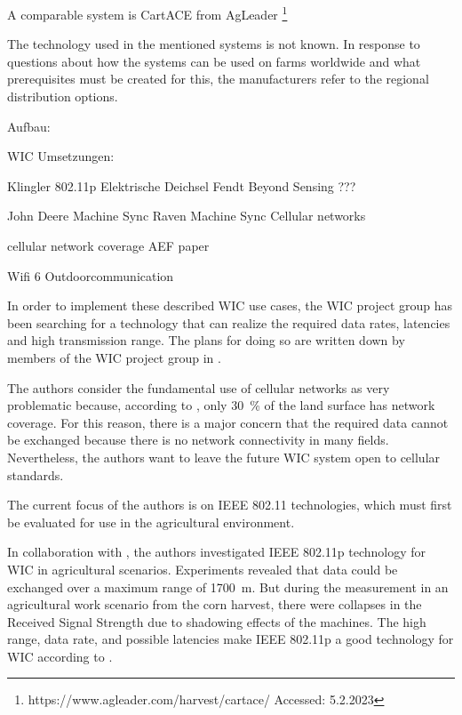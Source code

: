 \documentclass[]{nsm-thesis}
\begin{document}
A comparable system is CartACE from AgLeader \footnote{https://www.agleader.com/harvest/cartace/ Accessed: 5.2.2023}

The technology used in the mentioned systems is not known. In response to questions about how the systems can be used on farms worldwide and what prerequisites must be created for this, the manufacturers refer to the regional distribution options. 



Aufbau:

WIC Umsetzungen: 

Klingler 802.11p
Elektrische Deichsel Fendt
Beyond Sensing ???

John Deere Machine Sync
Raven Machine Sync
Cellular networks

cellular network coverage AEF paper 

Wifi 6 Outdoorcommunication



In order to implement these described \ac{WIC} use cases, the \ac{WIC} project group has been searching for a technology that can realize the required data rates, latencies and high transmission range. The plans for doing so are written down by members of the \ac{WIC} project group in \cite{schlingmann_challenges_2017}.

The authors consider the fundamental use of cellular networks as very problematic because, according to \cite{noauthor_ict_2016}, only \SI{30}{\percent} of the land surface has network coverage. For this reason, there is a major concern that the required data cannot be exchanged because there is no network connectivity in many fields. Nevertheless, the authors want to leave the future \ac{WIC} system open to cellular standards.

The current focus of the authors is on IEEE 802.11 technologies, which must first be evaluated for use in the agricultural environment.

In collaboration with \textcite{klingler_agriculture_2018}, the authors investigated IEEE 802.11p technology for \ac{WIC} in agricultural scenarios. Experiments revealed that data could be exchanged over a maximum range of \SI{1700}{\metre}. But during the measurement in an agricultural work scenario from the corn harvest, there were collapses in the Received Signal Strength due to shadowing effects of the machines. The high range, data rate, and possible latencies make IEEE 802.11p a good technology for \ac{WIC} according to \textcite{schlingmann_challenges_2017}.
\end{document}
